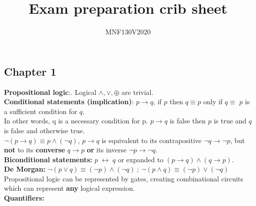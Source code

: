 \documentclass[12pt]{article}
\title{\huge Exam preparation crib sheet}
\author{\LARGE MNF130V2020}
\renewcommand{\iff}{\;\leftrightarrow\;}
\begin{document}
\maketitle

\bigskip

\newpage

\subsection{Chapter 1}
\smallskip
\textbf{Propositional logic}:. Logical $\wedge,\vee,\oplus$ are trivial. \\
\smallskip
\textbf{Conditional statements (implication)}: $p \rightarrow q$, if $p$ then $q \equiv p $ only if $q \equiv$ $p$ is a sufficient condition for $q$. \\
In other words, q is a necessary condition for p. $p \rightarrow q$ is false then $p$ is true and $q$ is false and otherwise true. \\
$\neg(p\rightarrow q)\equiv p \wedge (\neg q)$, $p \rightarrow q$ is equivalent to its contrapositive $\neg q \rightarrow \neg p$, but \textbf{not} to its \textbf{converse} $q \rightarrow p$ \textbf{or} its inverse $\neg p \rightarrow \neg q$. \\
\smallskip
\textbf{Biconditional statements:} $ p \iff q$ or expanded to $(p \rightarrow q) \wedge (q \rightarrow p)$. \\
\smallskip
\textbf{De Morgan:} $\neg(p \vee q) \equiv (\neg p) \wedge (\neg q)\ ;\ \neg(p \wedge q) \equiv (\neg p ) \vee (\neg q) $
\smallskip
Propositional logic can be represented by gates, creating combinational circuits which can represent \textbf{any} logical expression. \\
\medskip
\textbf{Quantifiers:}
\end{document}
